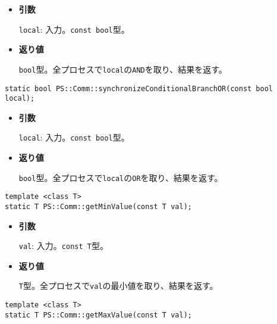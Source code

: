 \begin{itemize}

\item{{\bf 引数}}

{\tt local}: 入力。{\tt const bool}型。

\item{{\bf 返り値}}

{\tt bool}型。全プロセスで{\tt local}の{\tt AND}を取り、結果を返す。

\end{itemize}

\begin{screen}
\begin{verbatim}
static bool PS::Comm::synchronizeConditionalBranchOR(const bool local);
\end{verbatim}
\end{screen}

\begin{itemize}

\item{{\bf 引数}}

{\tt local}: 入力。{\tt const bool}型。

\item{{\bf 返り値}}

{\tt bool}型。全プロセスで{\tt local}の{\tt OR}を取り、結果を返す。

\end{itemize}

\begin{screen}
\begin{verbatim}
template <class T>
static T PS::Comm::getMinValue(const T val);
\end{verbatim}
\end{screen}

\begin{itemize}

\item{{\bf 引数}}

{\tt val}: 入力。{\tt const T}型。

\item{{\bf 返り値}}

{\tt T}型。全プロセスで{\tt val}の最小値を取り、結果を返す。

\end{itemize}

\begin{screen}
\begin{verbatim}
template <class T>
static T PS::Comm::getMaxValue(const T val);
\end{verbatim}
\end{screen}

